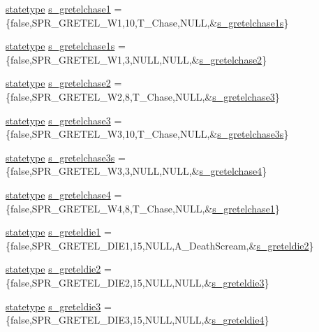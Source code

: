 \begin{DoxyCompactItemize}
\hyperlink{structstatestruct}{statetype} \hyperlink{WL__ACT2_8C_a6d420f4e0ef48ab7a3e7b67721af7a1e}{s\_\-gretelchase1} = \{false,SPR\_\-GRETEL\_\-W1,10,T\_\-Chase,NULL,\&\hyperlink{WL__ACT2_8C_a6681e7c207323c033617bc41aac29db7}{s\_\-gretelchase1s}\}
\item 
\hyperlink{structstatestruct}{statetype} \hyperlink{WL__ACT2_8C_a6681e7c207323c033617bc41aac29db7}{s\_\-gretelchase1s} = \{false,SPR\_\-GRETEL\_\-W1,3,NULL,NULL,\&\hyperlink{WL__ACT2_8C_aa65f0f83a848a34227fb2bb9e96348bc}{s\_\-gretelchase2}\}
\item 
\hyperlink{structstatestruct}{statetype} \hyperlink{WL__ACT2_8C_aa65f0f83a848a34227fb2bb9e96348bc}{s\_\-gretelchase2} = \{false,SPR\_\-GRETEL\_\-W2,8,T\_\-Chase,NULL,\&\hyperlink{WL__ACT2_8C_a6706248520f9e3ccae440f57e44ab6a1}{s\_\-gretelchase3}\}
\item 
\hyperlink{structstatestruct}{statetype} \hyperlink{WL__ACT2_8C_a6706248520f9e3ccae440f57e44ab6a1}{s\_\-gretelchase3} = \{false,SPR\_\-GRETEL\_\-W3,10,T\_\-Chase,NULL,\&\hyperlink{WL__ACT2_8C_ae2db03c8048b00b403283fa9457d2a8c}{s\_\-gretelchase3s}\}
\item 
\hyperlink{structstatestruct}{statetype} \hyperlink{WL__ACT2_8C_ae2db03c8048b00b403283fa9457d2a8c}{s\_\-gretelchase3s} = \{false,SPR\_\-GRETEL\_\-W3,3,NULL,NULL,\&\hyperlink{WL__ACT2_8C_af804f015551047b0346655fbc9d28a69}{s\_\-gretelchase4}\}
\item 
\hyperlink{structstatestruct}{statetype} \hyperlink{WL__ACT2_8C_af804f015551047b0346655fbc9d28a69}{s\_\-gretelchase4} = \{false,SPR\_\-GRETEL\_\-W4,8,T\_\-Chase,NULL,\&\hyperlink{WL__DEF_8H_a6d420f4e0ef48ab7a3e7b67721af7a1e}{s\_\-gretelchase1}\}
\item 
\hyperlink{structstatestruct}{statetype} \hyperlink{WL__ACT2_8C_ad13ff510f50e05b58f44d971b4b0bf7c}{s\_\-greteldie1} = \{false,SPR\_\-GRETEL\_\-DIE1,15,NULL,A\_\-DeathScream,\&\hyperlink{WL__ACT2_8C_a06256ecf09ec98967b9202803aac9db8}{s\_\-greteldie2}\}
\item 
\hyperlink{structstatestruct}{statetype} \hyperlink{WL__ACT2_8C_a06256ecf09ec98967b9202803aac9db8}{s\_\-greteldie2} = \{false,SPR\_\-GRETEL\_\-DIE2,15,NULL,NULL,\&\hyperlink{WL__ACT2_8C_acd062dec778f9e003bd1922935d3e802}{s\_\-greteldie3}\}
\item 
\hyperlink{structstatestruct}{statetype} \hyperlink{WL__ACT2_8C_acd062dec778f9e003bd1922935d3e802}{s\_\-greteldie3} = \{false,SPR\_\-GRETEL\_\-DIE3,15,NULL,NULL,\&\hyperlink{WL__ACT2_8C_a95821a58802556e05bfe6530c5eead56}{s\_\-greteldie4}\}
\item 

\end{DoxyCompactItemize}
